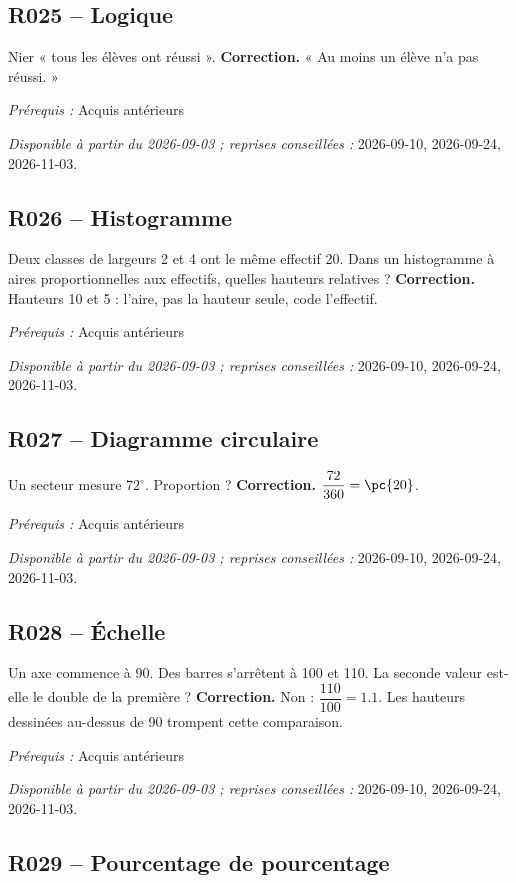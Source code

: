 \subsection*{R025 -- Logique}\label{R025}
Nier « tous les élèves ont réussi ».
\ifmxteacher\textbf{Correction.} « Au moins un élève n’a pas réussi. »\par\textit{Prérequis :} Acquis antérieurs\par\textit{Disponible à partir du 2026-09-03 ; reprises conseillées :} 2026-09-10, 2026-09-24, 2026-11-03.\fi
{}\subsection*{R026 -- Histogramme}\label{R026}
Deux classes de largeurs 2 et 4 ont le même effectif 20. Dans un histogramme à aires proportionnelles aux effectifs, quelles hauteurs relatives ?
\ifmxteacher\textbf{Correction.} Hauteurs 10 et 5 : l’aire, pas la hauteur seule, code l’effectif.\par\textit{Prérequis :} Acquis antérieurs\par\textit{Disponible à partir du 2026-09-03 ; reprises conseillées :} 2026-09-10, 2026-09-24, 2026-11-03.\fi
{}\subsection*{R027 -- Diagramme circulaire}\label{R027}
Un secteur mesure $72^\circ$. Proportion ?
\ifmxteacher\textbf{Correction.} $\dfrac{72}{360}=\pc{20}$.\par\textit{Prérequis :} Acquis antérieurs\par\textit{Disponible à partir du 2026-09-03 ; reprises conseillées :} 2026-09-10, 2026-09-24, 2026-11-03.\fi
{}\subsection*{R028 -- Échelle}\label{R028}
Un axe commence à 90. Des barres s’arrêtent à 100 et 110. La seconde valeur est-elle le double de la première ?
\ifmxteacher\textbf{Correction.} Non : $\dfrac{110}{100}=\num{1,1}$. Les hauteurs dessinées au-dessus de 90 trompent cette comparaison.\par\textit{Prérequis :} Acquis antérieurs\par\textit{Disponible à partir du 2026-09-03 ; reprises conseillées :} 2026-09-10, 2026-09-24, 2026-11-03.\fi
{}\subsection*{R029 -- Pourcentage de pourcentage}\label{R029}
